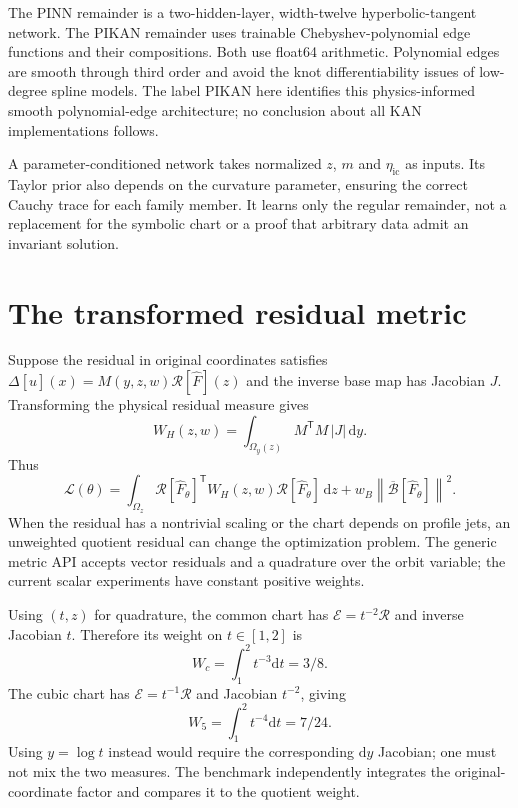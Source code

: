\documentclass[12pt,a4paper,oneside]{report}
\numberwithin{equation}{chapter}
\newcommand{\R}{\mathcal R}
\newcommand{\E}{\mathcal E}
\newcommand{\dd}{\mathrm d}
\newcommand{\norm}[1]{\left\lVert#1\right\rVert}
\begin{document}
The PINN remainder is a two-hidden-layer, width-twelve hyperbolic-tangent
network. The PIKAN remainder uses trainable Chebyshev-polynomial edge
functions and their compositions. Both use float64 arithmetic. Polynomial
edges are smooth through third order and avoid the knot differentiability
issues of low-degree spline models. The label PIKAN here identifies this
physics-informed smooth polynomial-edge architecture; no conclusion about
all KAN implementations follows.

A parameter-conditioned network takes normalized $z$, $m$ and
$\eta_{\mathrm{ic}}$ as inputs. Its Taylor prior also depends on the curvature
parameter, ensuring the correct Cauchy trace for each family member. It learns
only the regular remainder, not a replacement for the symbolic chart or a
proof that arbitrary data admit an invariant solution.

\section{The transformed residual metric}
Suppose the residual in original coordinates satisfies
$\Delta[\widehat u](x)=M(y,z,w)\R[\widehat F](z)$ and the inverse base map has
Jacobian $J$. Transforming the physical residual measure gives
\begin{equation}\label{eq:metric}
W_H(z,w)=\int_{\Omega_y(z)}M^{\mathsf T}M\,|J|\,\dd y.
\end{equation}
Thus
\begin{equation}\label{eq:loss}
\mathcal L(\theta)=\int_{\Omega_z}\R[\widehat F_\theta]^{\mathsf T}
 W_H(z,w)\R[\widehat F_\theta]\,\dd z
 +w_B\norm{\overline{\mathcal B}[\widehat F_\theta]}^2.
\end{equation}
When the residual has a nontrivial scaling or the chart depends on profile
jets, an unweighted quotient residual can change the optimization problem.
The generic metric API accepts vector residuals and a quadrature over the
orbit variable; the current scalar experiments have constant positive weights.

Using $(t,z)$ for quadrature, the common chart has $\E=t^{-2}\R$ and inverse
Jacobian $t$. Therefore its weight on $t\in[1,2]$ is
\begin{equation}
W_c=\int_1^2t^{-3}\dd t=3/8.
\end{equation}
The cubic chart has $\E=t^{-1}\R$ and Jacobian $t^{-2}$, giving
\begin{equation}
W_5=\int_1^2t^{-4}\dd t=7/24.
\end{equation}
Using $y=\log t$ instead would require the corresponding $\dd y$ Jacobian;
one must not mix the two measures. The benchmark independently integrates the
original-coordinate factor and compares it to the quotient weight.
\end{document}
